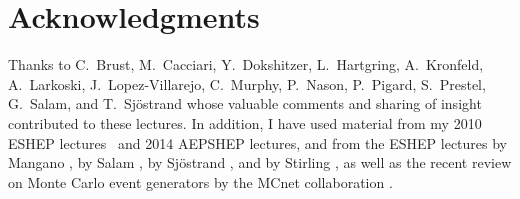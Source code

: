 \documentclass[11pt,letterpaper,twopage,pdf]{article}
\begin{document}
\clearpage
\tableofcontents
\clearpage%



\clearpage


\clearpage


\clearpage


\clearpage


\section*{Acknowledgments}
Thanks to C.~Brust, M.~Cacciari, Y.~Dokshitzer, L.~Hartgring, A.~Kronfeld, 
A.~Larkoski, J.~Lopez-Villarejo,
C.~Murphy, P.~Nason, P.~Pigard, S.~Prestel, G.~Salam, and T.~Sj\"ostrand
whose valuable comments and sharing of insight contributed to these lectures. 
In addition, I have used material from my 2010 ESHEP
lectures~\cite{Skands:2011pf} and 2014 AEPSHEP lectures, and from 
the ESHEP lectures by Mangano \cite{Ellis:2009zzb}, by
Salam \cite{Salam:2010zt,Grojean:2010ab}, by Sj\"ostrand \cite{Sjostrand:2006su}, 
and by Stirling \cite{Ellis:2008zzf}, as well as the recent review on
Monte Carlo event generators by the MCnet collaboration \cite{Buckley:2011ms}. 



\section*{}
\clearpage
{}
\printindex
\end{document}
